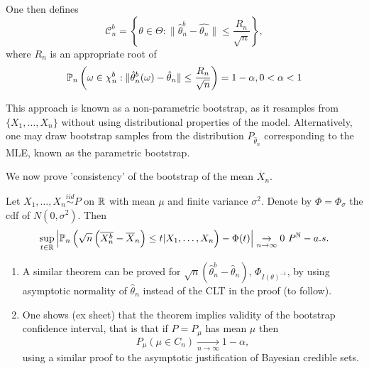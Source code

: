\documentclass[a4paper]{article}
\begin{document}
One then defines 
\[
\mathcal{C}_n^{b} = \left\{ \theta \in \Theta : \|\hat{\theta}_n^{b} - \hat{\theta_n}\| \le \frac{R_n}{\sqrt{n} } \right\}
,\] where $R_n$ is an appropriate root of
\[
	\P_n \left(\omega \in \chi_n^{b} : \|\hat{\theta}_n^{b}(\omega) - \hat{\theta}_n\| \le \frac{R_n}{\sqrt{n} }\right) = 1- \alpha, 0 < \alpha < 1
\] 

This approach is known as a non-parametric bootstrap, as it resamples from $\{X_1,\ldots,X_n\} $ without using distributional properties of the model. Alternatively, one may draw bootstrap samples from the distribution $P_{\hat{\theta}_n}$ corresponding to the MLE, known as the parametric bootstrap.  

We now prove 'consistency' of the bootstrap of the mean $\overline{X}_n$. 

\begin{thm}
	Let $X_1,\ldots,X_n \stackrel{iid}{\sim} P$ on $\R$ with mean $\mu$ and finite variance $\sigma^2$. Denote by $\Phi = \Phi_{\sigma}$ the cdf of $N(0, \sigma^2)$. Then
	\begin{align*}
		\sup_{t \in \R} \left|\P_n \left( \sqrt{n} \left( \overline{X_n^{b}} - \overline{X}_n \right) \le t | X_1,\ldots,X_n \right) - \Phi(t)\right| \underset{n\to \infty}{\to } 0 \text{ }P^{\N}-a.s. 
	\end{align*}
\end{thm}

\begin{remark}
	\begin{enumerate}
		\item A similar theorem can be proved for $\sqrt{n} (\hat{\theta}_n^{b} - \hat{\theta}_n)$, $\Phi_{I(\theta)^{-1}}$, by using asymptotic normality of $\hat{\theta}_n$ instead of the CLT in the proof (to follow).
		
		\item One shows (ex sheet) that the theorem implies validity of the bootstrap confidence interval, that is that if $P = P_{\mu}$ has mean $\mu$ then 
			\[
				P_{\mu} (\mu \in C_n) \underset{n\to \infty}{\to } 1- \alpha
			,\]
			using a similar proof to the asymptotic justification of Bayesian credible sets.
	\end{enumerate}
\end{remark}
\end{document}

